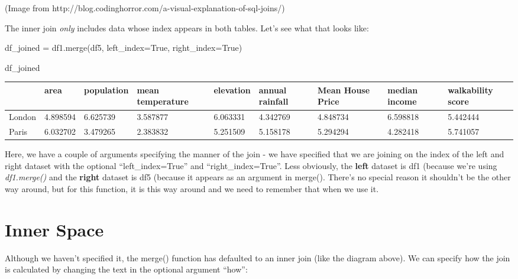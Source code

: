 \documentclass[
  letterpaper,
  DIV=11,
  numbers=noendperiod]{scrreprt}
\newenvironment{Shaded}{\begin{snugshade}}{\end{snugshade}}
\newcommand{\NormalTok}[1]{\textcolor[rgb]{0.00,0.23,0.31}{#1}}
\newcommand{\OperatorTok}[1]{\textcolor[rgb]{0.37,0.37,0.37}{#1}}
\newcommand{\VariableTok}[1]{\textcolor[rgb]{0.07,0.07,0.07}{#1}}
\begin{document}
(Image from
http://blog.codinghorror.com/a-visual-explanation-of-sql-joins/)

The inner join \emph{only} includes data whose index appears in both
tables. Let's see what that looks like:

\begin{Shaded}
\begin{Highlighting}[]
\NormalTok{df\_joined }\OperatorTok{=}\NormalTok{ df1.merge(df5, left\_index}\OperatorTok{=}\VariableTok{True}\NormalTok{, right\_index}\OperatorTok{=}\VariableTok{True}\NormalTok{)}
\end{Highlighting}
\end{Shaded}

\begin{Shaded}
\begin{Highlighting}[]
\NormalTok{df\_joined}
\end{Highlighting}
\end{Shaded}

\begin{longtable}[]{@{}lllllllll@{}}
\toprule\noalign{}
& area & population & mean temperature & elevation & annual rainfall &
Mean House Price & median income & walkability score \\
\midrule\noalign{}
\endhead
\bottomrule\noalign{}
\endlastfoot
London & 4.898594 & 6.625739 & 3.587877 & 6.063331 & 4.342769 & 4.848734
& 6.598818 & 5.442444 \\
Paris & 6.032702 & 3.479265 & 2.383832 & 5.251509 & 5.158178 & 5.294294
& 4.282418 & 5.741057 \\
\end{longtable}

Here, we have a couple of arguments specifying the manner of the join -
we have specified that we are joining on the index of the left and right
dataset with the optional ``left\_index=True'' and
``right\_index=True''. Less obviously, the \textbf{left} dataset is df1
(because we're using \emph{df1.merge()} and the \textbf{right} dataset
is df5 (because it appears as an argument in merge(). There's no special
reason it shouldn't be the other way around, but for this function, it
is this way around and we need to remember that when we use it.

\hypertarget{inner-space}{%
\section{Inner Space}\label{inner-space}}

Although we haven't specified it, the merge() function has defaulted to
an inner join (like the diagram above). We can specify how the join is
calculated by changing the text in the optional argument ``how'':
\end{document}
